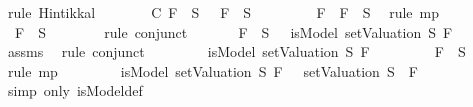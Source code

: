 \begin{isabellebody}
\ {\isacharparenleft}rule\ Hintikka{\isacharunderscore}l{}{\isacharparenright}\isanewline
\ \ \ \ \isamarkupfalse%
\ \isamarkupfalse%
\ C{\isacharcolon}{\isachardoublequoteopen}\isactrlbold {\isasymnot}\ F{}\ {\isasymin}\ S\ {\isasymand}\ \isactrlbold {\isasymnot}\ F{}\ {\isasymin}\ S{\isachardoublequoteclose}\isanewline
\ \ \ \ \ \ \isamarkupfalse%
\ {\isacartoucheopen}\isactrlbold {\isasymnot}\ {\isacharparenleft}F{}\ \isactrlbold {\isasymor}\ F{}{\isacharparenright}\ {\isasymin}\ S{\isacartoucheclose}\ \isamarkupfalse%
\ {\isacharparenleft}rule\ mp{\isacharparenright}\isanewline
\ \ \ \ \isamarkupfalse%
\ \isamarkupfalse%
\ {\isachardoublequoteopen}\isactrlbold {\isasymnot}\ F{}\ {\isasymin}\ S{\isachardoublequoteclose}\isanewline
\ \ \ \ \ \ \isamarkupfalse%
\ {\isacharparenleft}rule\ conjunct{}{\isacharparenright}\isanewline
\ \ \ \ \isamarkupfalse%
\ {\isachardoublequoteopen}\isactrlbold {\isasymnot}\ F{}\ {\isasymin}\ S\ {\isasymlongrightarrow}\ {\isasymnot}\ isModel\ {\isacharparenleft}setValuation\ S{\isacharparenright}\ F{}{\isachardoublequoteclose}\isanewline
\ \ \ \ \ \ \isamarkupfalse%
\ assms{\isacharparenleft}{}{\isacharparenright}\ \isamarkupfalse%
\ {\isacharparenleft}rule\ conjunct{}{\isacharparenright}\isanewline
\ \ \ \ \isamarkupfalse%
\ \isamarkupfalse%
\ {\isachardoublequoteopen}{\isasymnot}\ isModel\ {\isacharparenleft}setValuation\ S{\isacharparenright}\ F{}{\isachardoublequoteclose}\isanewline
\ \ \ \ \ \ \isamarkupfalse%
\ {\isacartoucheopen}\isactrlbold {\isasymnot}\ F{}\ {\isasymin}\ S{\isacartoucheclose}\ \isamarkupfalse%
\ {\isacharparenleft}rule\ mp{\isacharparenright}\isanewline
\ \ \ \ \isamarkupfalse%
\ \isamarkupfalse%
\ {\isachardoublequoteopen}{\isacharparenleft}{\isasymnot}\ isModel\ {\isacharparenleft}setValuation\ S{\isacharparenright}\ F{}{\isacharparenright}\ {\isacharequal}\ {\isacharparenleft}{\isasymnot}\ {\isacharparenleft}setValuation\ S{\isacharparenright}\ {\isasymTurnstile}\ F{}{\isacharparenright}{\isachardoublequoteclose}\isanewline
\ \ \ \ \ \ \isamarkupfalse%
\ {\isacharparenleft}simp\ only{\isacharcolon}\ isModel{\isacharunderscore}def{\isacharparenright}\isanewline

\end{isabellebody}
